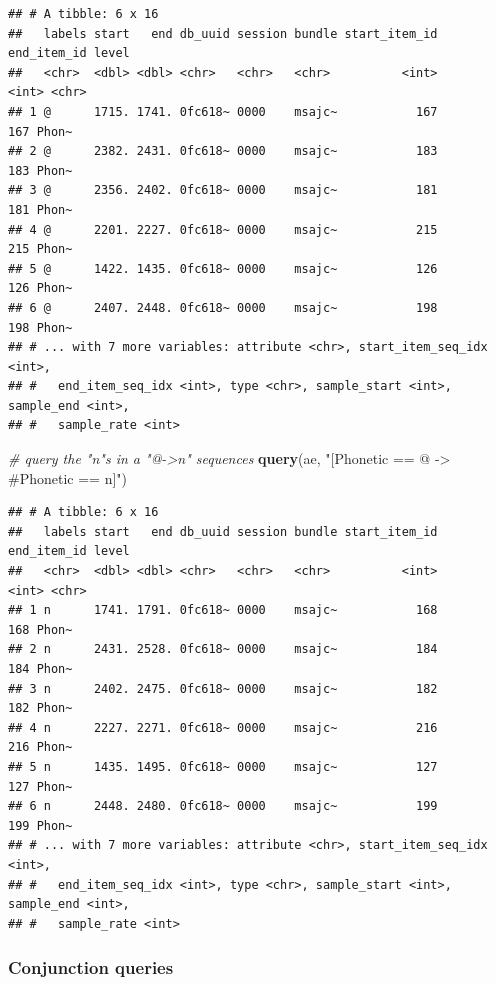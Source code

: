 \documentclass[]{book}
\newenvironment{Shaded}{\begin{snugshade}}{\end{snugshade}}
\newcommand{\CommentTok}[1]{\textcolor[rgb]{0.56,0.35,0.01}{\textit{#1}}}
\newcommand{\KeywordTok}[1]{\textcolor[rgb]{0.13,0.29,0.53}{\textbf{#1}}}
\newcommand{\NormalTok}[1]{#1}
\newcommand{\StringTok}[1]{\textcolor[rgb]{0.31,0.60,0.02}{#1}}
\begin{document}
\begin{verbatim}
## # A tibble: 6 x 16
##   labels start   end db_uuid session bundle start_item_id end_item_id level
##   <chr>  <dbl> <dbl> <chr>   <chr>   <chr>          <int>       <int> <chr>
## 1 @      1715. 1741. 0fc618~ 0000    msajc~           167         167 Phon~
## 2 @      2382. 2431. 0fc618~ 0000    msajc~           183         183 Phon~
## 3 @      2356. 2402. 0fc618~ 0000    msajc~           181         181 Phon~
## 4 @      2201. 2227. 0fc618~ 0000    msajc~           215         215 Phon~
## 5 @      1422. 1435. 0fc618~ 0000    msajc~           126         126 Phon~
## 6 @      2407. 2448. 0fc618~ 0000    msajc~           198         198 Phon~
## # ... with 7 more variables: attribute <chr>, start_item_seq_idx <int>,
## #   end_item_seq_idx <int>, type <chr>, sample_start <int>, sample_end <int>,
## #   sample_rate <int>
\end{verbatim}

\begin{Shaded}
\begin{Highlighting}[]
\CommentTok{# query the "n"s in a "@->n" sequences}
\KeywordTok{query}\NormalTok{(ae, }\StringTok{"[Phonetic == @ -> #Phonetic == n]"}\NormalTok{)}
\end{Highlighting}
\end{Shaded}

\begin{verbatim}
## # A tibble: 6 x 16
##   labels start   end db_uuid session bundle start_item_id end_item_id level
##   <chr>  <dbl> <dbl> <chr>   <chr>   <chr>          <int>       <int> <chr>
## 1 n      1741. 1791. 0fc618~ 0000    msajc~           168         168 Phon~
## 2 n      2431. 2528. 0fc618~ 0000    msajc~           184         184 Phon~
## 3 n      2402. 2475. 0fc618~ 0000    msajc~           182         182 Phon~
## 4 n      2227. 2271. 0fc618~ 0000    msajc~           216         216 Phon~
## 5 n      1435. 1495. 0fc618~ 0000    msajc~           127         127 Phon~
## 6 n      2448. 2480. 0fc618~ 0000    msajc~           199         199 Phon~
## # ... with 7 more variables: attribute <chr>, start_item_seq_idx <int>,
## #   end_item_seq_idx <int>, type <chr>, sample_start <int>, sample_end <int>,
## #   sample_rate <int>
\end{verbatim}

\hypertarget{conjunction-queries}{%
\subsubsection{Conjunction queries}\label{conjunction-queries}}
\end{document}
